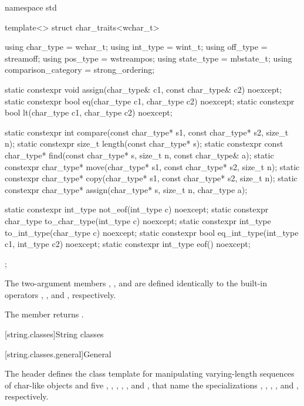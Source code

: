 %
\begin{codeblock}
namespace std {
  template<> struct char_traits<wchar_t> {
    using char_type  = wchar_t;
    using int_type   = wint_t;
    using off_type   = streamoff;
    using pos_type   = wstreampos;
    using state_type = mbstate_t;
    using comparison_category = strong_ordering;

    static constexpr void assign(char_type& c1, const char_type& c2) noexcept;
    static constexpr bool eq(char_type c1, char_type c2) noexcept;
    static constexpr bool lt(char_type c1, char_type c2) noexcept;

    static constexpr int compare(const char_type* s1, const char_type* s2, size_t n);
    static constexpr size_t length(const char_type* s);
    static constexpr const char_type* find(const char_type* s, size_t n,
                                           const char_type& a);
    static constexpr char_type* move(char_type* s1, const char_type* s2, size_t n);
    static constexpr char_type* copy(char_type* s1, const char_type* s2, size_t n);
    static constexpr char_type* assign(char_type* s, size_t n, char_type a);

    static constexpr int_type not_eof(int_type c) noexcept;
    static constexpr char_type to_char_type(int_type c) noexcept;
    static constexpr int_type to_int_type(char_type c) noexcept;
    static constexpr bool eq_int_type(int_type c1, int_type c2) noexcept;
    static constexpr int_type eof() noexcept;
  };
}
\end{codeblock}


\pnum
The two-argument members
,
,
and
are defined identically
to the built-in operators
\tcode{=},
\tcode{==},
and
\tcode{<},
respectively.

\pnum
The member
returns
.

[string.classes]{String classes}

[string.classes.general]{General}

\pnum
The header  defines the
 class template for manipulating
varying-length sequences of char-like objects and five
, ,
,
,
,
and , that name
the specializations
,
,
,
,
and
, respectively.


